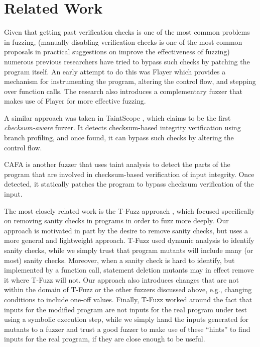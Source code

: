 \section{Related Work}

Given that getting past verification checks is one of the most common problems in fuzzing,
(manually disabling verification checks is one of the most common proposals in practical \cite{chromeadvice}
suggestions on improve the effectiveness of fuzzing)
numerous previous researchers have tried to bypass such checks by
patching the program itself.
An early attempt to do this was Flayer \cite{drewry2O07flayer} which
provides a mechanism for instrumenting the program, altering the control flow,
and stepping over function calls. The research also introduces a complementary
fuzzer that makes use of Flayer for more effective fuzzing.

A similar approach was taken in TaintScope \cite{wang2010taintscope},
which claims to be the first \emph{checksum-aware} fuzzer.
 It detects checksum-based integrity verification using branch profiling, and once found, it can
bypass such checks by altering the control flow.

CAFA \cite{liu2018cafa} is another fuzzer that uses taint analysis to detect the
parts of the program that are involved in checksum-based verification of
input integrity. Once detected, it statically patches the program to bypass
checksum verification of the input.

The most closely related work is the T-Fuzz approach \cite{tfuzz}, which focused specifically on removing sanity checks in programs in order to fuzz more deeply.  Our approach is motivated in part by the desire to remove sanity checks, but uses a more general and lightweight approach.  T-Fuzz used dynamic analysis to identify sanity checks, while we simply trust that program mutants will include many (or most) sanity checks.  Moreover, when a sanity check is hard to identify, but implemented by a function call, statement deletion mutants may in effect remove it where T-Fuzz will not.  Our approach also introduces changes that are not within the domain of T-Fuzz or the other fuzzers discussed above, e.g., changing conditions to include one-off values.  Finally, T-Fuzz worked around the fact that inputs for the modified program are not inputs for the real program under test using a symbolic execution step, while we simply hand the inputs generated for mutants to a fuzzer and trust a good fuzzer to make use of these ``hints'' to find inputs for the real program, if they are close enough to be useful.

